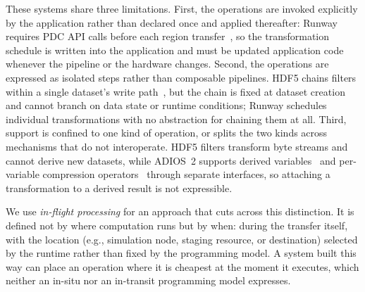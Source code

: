 These systems share three limitations. First, the operations are invoked explicitly by the application rather than declared once and applied thereafter: Runway requires PDC API calls before each region transfer~\cite{ravi2023runway}, so the transformation schedule is written into the application and must be updated application code whenever the pipeline or the hardware changes. Second, the operations are expressed as isolated steps rather than composable pipelines. HDF5 chains filters within a single dataset's write path~\cite{hdf5}, but the chain is fixed at dataset creation and cannot branch on data state or runtime conditions; Runway schedules individual transformations with no abstraction for chaining them at all. Third, support is confined to one kind of operation, or splits the two kinds across mechanisms that do not interoperate. HDF5 filters transform byte streams and cannot derive new datasets, while ADIOS~2 supports derived variables~\cite{gainaru2024toderive} and per-variable compression operators~\cite{godoy2020adios2} through separate interfaces, so attaching a transformation to a derived result is not expressible.

We use \emph{in-flight processing} for an approach that cuts across this distinction. It is defined not by where computation runs but by when: during the transfer itself, with the location (e.g., simulation node, staging resource, or destination) selected by the runtime rather than fixed by the programming model. A system built this way can place an operation where it is cheapest at the moment it executes, which neither an in-situ nor an in-transit programming model expresses.

